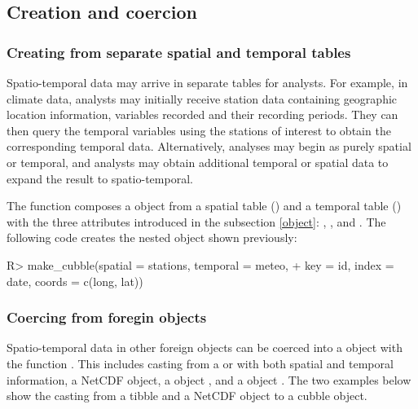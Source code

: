 \documentclass[
  shortnames]{jss}
\begin{document}
\hypertarget{create}{%
\subsection{Creation and coercion}\label{create}}

\hypertarget{creating-from-separate-spatial-and-temporal-tables}{%
\subsubsection{Creating from separate spatial and temporal tables}\label{creating-from-separate-spatial-and-temporal-tables}}

Spatio-temporal data may arrive in separate tables for analysts. For example, in climate data, analysts may initially receive station data containing geographic location information, variables recorded and their recording periods. They can then query the temporal variables using the stations of interest to obtain the corresponding temporal data. Alternatively, analyses may begin as purely spatial or temporal, and analysts may obtain additional temporal or spatial data to expand the result to spatio-temporal.

The function  composes a  object from a spatial table () and a temporal table () with the three attributes introduced in the subsection \ref{object}: , , and . The following code creates the nested  object shown previously:

\begin{CodeChunk}
\begin{CodeInput}
R> make_cubble(spatial = stations, temporal = meteo,
+             key = id, index = date, coords = c(long, lat))
\end{CodeInput}
\end{CodeChunk}

\hypertarget{coercing-from-foregin-objects}{%
\subsubsection{Coercing from foregin objects}\label{coercing-from-foregin-objects}}

Spatio-temporal data in other foreign objects can be coerced into a  object with the function . This includes casting from a  or  with both spatial and temporal information, a NetCDF object, a  object \citep{stars}, and a  object \citep{sftime}. The two examples below show the casting from a tibble and a NetCDF object to a cubble object.
\end{document}
